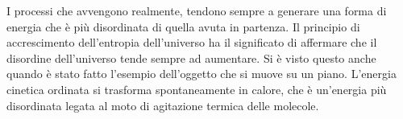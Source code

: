 \documentclass[10pt,a4paper]{book}
\begin{document}
I processi che avvengono realmente, tendono sempre a generare una forma di energia che è più disordinata di quella avuta in partenza. Il principio di accrescimento dell'entropia dell'universo ha il significato di affermare che il disordine dell'universo tende sempre ad aumentare. Si è visto questo anche quando è stato fatto l'esempio dell'oggetto che si muove su un piano. L'energia cinetica ordinata si trasforma spontaneamente in calore, che è un'energia più disordinata legata al moto di agitazione termica delle molecole.
\begin{figure}[htpb]
	\centering
	


	\begin{tikzpicture}[x=0.75pt,y=0.75pt,yscale=-1,xscale=1]


\end{tikzpicture}
\end{figure}
\end{document}
